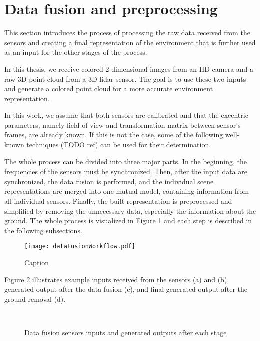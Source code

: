 \section{Data fusion and preprocessing}

This section introduces the process of processing the raw data received from the sensors and creating a final representation of the environment that is further used as an input for the other stages of the process.\par
In this thesis, we receive colored 2-dimensional images from an HD camera and a raw 3D point cloud from a 3D lidar sensor. The goal is to use these two inputs and generate a colored point cloud for a more accurate environment representation.\par
In this work, we assume that both sensors are calibrated and that the excentric parameters, namely field of view and transformation matrix between sensor's frames, are already known. If this is not the case, some of the following well-known techniques (TODO ref) can be used for their determination.\par
The whole process can be divided into three major parts. In the beginning, the frequencies of the sensors must be synchronized. Then, after the input data are synchronized, the data fusion is performed, and the individual scene representations are merged into one mutual model, containing information from all individual sensors. Finally, the built representation is preprocessed and simplified by removing the unnecessary data, especially the information about the ground. The whole process is visualized in Figure \ref{fig:dataFusionWorkflow} and each step is described in the following subsections.

\begin{figure}[htpb]
    \centering
    \texttt{[image: dataFusionWorkflow.pdf]}
    \caption{Caption} \label{fig:dataFusionWorkflow}
\end{figure}

Figure \ref{fig:dataFusionExample} illustrates example inputs received from the sensors (a) and (b), generated output after the data fusion (c), and final generated output after the ground removal (d).

\begin{figure}[!tbp]
    \centering
    \hfill
    \\
    \hfill
    \caption{Data fusion sensors inputs and generated outputs after each stage}
    \label{fig:dataFusionExample}
\end{figure}

